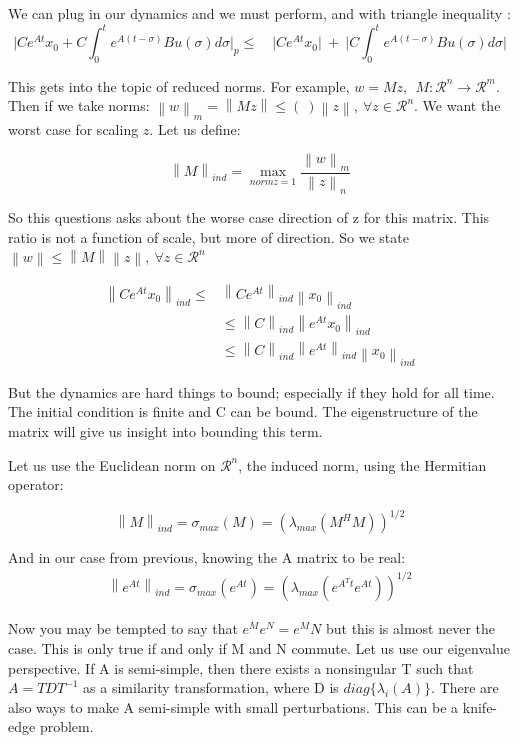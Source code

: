 \documentclass[11pt]{article}
\newcommand{\norm}[1]{\left\lVert#1\right\rVert}
\begin{document}
We can plug in our dynamics and we must perform, and with triangle inequality :
\begin{equation}
	\rvert Ce^{At}x_0 + C \int_0^t e^{A(t-\sigma)} Bu(\sigma)d\sigma \rvert_p \leq \quad \rvert Ce^{At}x_0  \rvert \ + \ \rvert  C \int_0^t e^{A(t-\sigma)}Bu(\sigma)d\sigma \rvert
\end{equation}

This gets into the topic of reduced norms.  For example, $w = Mz,\ \ M:\mathcal{R}^n \rightarrow \mathcal{R}^m$. Then if we take norms: $\norm{w}_m = \norm{Mz} \leq ( \ )  \norm{z}, \ \forall z \in \mathcal{R}^n$. We want the worst case for scaling $z$.  Let us define:

\begin{equation}
 \norm{M}_{ind} = \max_{norm{z}=1} \frac{\norm{w}_m}{\norm{z}_n}
\end{equation}

So this questions asks about the worse case direction of z for this matrix. This ratio is not a function of scale, but more of direction. So we state $\norm{w} \leq \norm{M} \norm{z}, \ \forall z \in  \mathcal{R}^n$


\begin{align}
\norm{Ce^{At}x_0}_{ind} \leq & \norm{Ce^{At}}_{ind}\norm{x_0}_{ind} \\ 
& \leq \norm{C}_{ind} \norm{e^{At}x_0}_{ind} \\
& \leq \norm{C}_{ind} \norm{e^{At}}_{ind} \norm{x_0}_{ind}
\end{align}

But the dynamics are hard things to bound; especially if they hold for all time. The initial condition is finite and C can be bound. The eigenstructure of the matrix will give us insight into bounding this term.

Let us use the Euclidean norm on $\mathcal{R}^n$, the induced norm, using the Hermitian operator: 

\begin{equation}
\norm{M}_{ind} = \sigma_{max}(M) = (\lambda_{max}(M^HM))^{1/2}
\end{equation}

And in our case from previous, knowing the A matrix to be real:
\begin{align}
\norm{e^{At}}_{ind} = \sigma_{max}(e^{At}) = (\lambda_{max}(e^{A^Tt}e^{At}))^{1/2}
\end{align}

Now you may be tempted to say that $e^M e^N = e^MN$ but this is almost never the case. This is only true if and only if M and N commute. Let us use our eigenvalue perspective. If A is semi-simple, then there exists a nonsingular T such that $A = TDT^{-1}$ as a similarity transformation, where D is $diag\{ \lambda_i(A) \}$. There are also ways to make A semi-simple with small perturbations. This can be a knife-edge problem.
\end{document}
